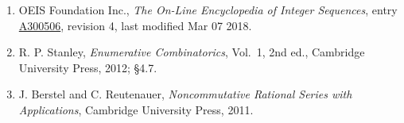\documentclass[11pt]{article}
\theoremstyle{definition}
\begin{document}
\begin{enumerate}

\item OEIS Foundation Inc., \emph{The On-Line Encyclopedia of Integer Sequences}, entry \href{https://oeis.org/A300506}{A300506}, revision 4, last modified Mar 07 2018.

\item R. P. Stanley, \emph{Enumerative Combinatorics}, Vol.~1, 2nd ed., Cambridge University Press, 2012; \S4.7.

\item J. Berstel and C. Reutenauer, \emph{Noncommutative Rational Series with Applications}, Cambridge University Press, 2011.

\end{enumerate}
\end{document}
